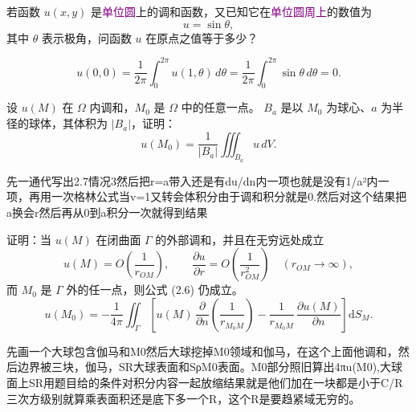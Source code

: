 \begin{homework}[2]
若函数 $u(x,y)$ 是\textcolor{purple}{单位圆}上的调和函数，又已知它在\textcolor{purple}{单位圆周上}的数值为
\[
u = \sin\theta,
\]
其中 $\theta$ 表示极角，问函数 $u$ 在原点之值等于多少？
\end{homework}
\begin{dxtips}[填空]
  \[
u(0,0)=\frac{1}{2\pi}\int_{0}^{2\pi}u(1,\theta)\,d\theta
=\frac{1}{2\pi}\int_{0}^{2\pi}\sin\theta\,d\theta=0.
\]
\end{dxtips}

\begin{homework}[3]
设 $u(M)$ 在 $\Omega$ 内调和，$M_0$ 是 $\Omega$ 中的任意一点。
$B_a$ 是以 $M_0$ 为球心、$a$ 为半径的球体，其体积为 $|B_a|$，证明：
\[
u(M_0)=\frac{1}{|B_a|}\iiint_{B_a} u\,dV.
\]
\end{homework}

\begin{dxtips}[老师提到过]
   先一通代写出2.7情况3然后把r=a带入还是有du/dn内一项也就是没有1/a²内一项，再用一次格林公式当v=1又转会体积分由于调和积分就是0.然后对这个结果把a换会r然后再从0到a积分一次就得到结果 
\end{dxtips}


\begin{homework}[4]
证明：当 $u(M)$ 在闭曲面 $\Gamma$ 的外部调和，并且在无穷远处成立
\[
u(M)=O\!\left(\frac{1}{r_{OM}}\right),\qquad
\frac{\partial u}{\partial r}=O\!\left(\frac{1}{r_{OM}^2}\right)
\quad (r_{OM}\to\infty),
\]
而 $M_0$ 是 $\Gamma$ 外的任一点，则公式 (2.6) 仍成立。
\begin{equation}\tag{2.6}\label{eq:2.6}
u(M_0)
= -\frac{1}{4\pi}
  \iint_{\Gamma}
  \left[
    u(M)\,\frac{\partial}{\partial n}
      \!\left(\frac{1}{r_{M_0M}}\right)
    - \frac{1}{r_{M_0M}}\,
      \frac{\partial u(M)}{\partial n}
  \right]\mathrm dS_M .
\end{equation}
\end{homework}
\begin{dxtips}
    先画一个大球包含伽马和M0然后大球挖掉M0领域和伽马，在这个上面他调和，然后边界被三块，伽马，SR大球表面和SρM0表面。M0部分照旧算出4πu(M0),大球面上SR用题目给的条件对积分内容一起放缩结果就是他们加在一块都是小于C/R三次方级别就算乘表面积还是底下多一个R，这个R是要趋紧域无穷的。
\end{dxtips}


